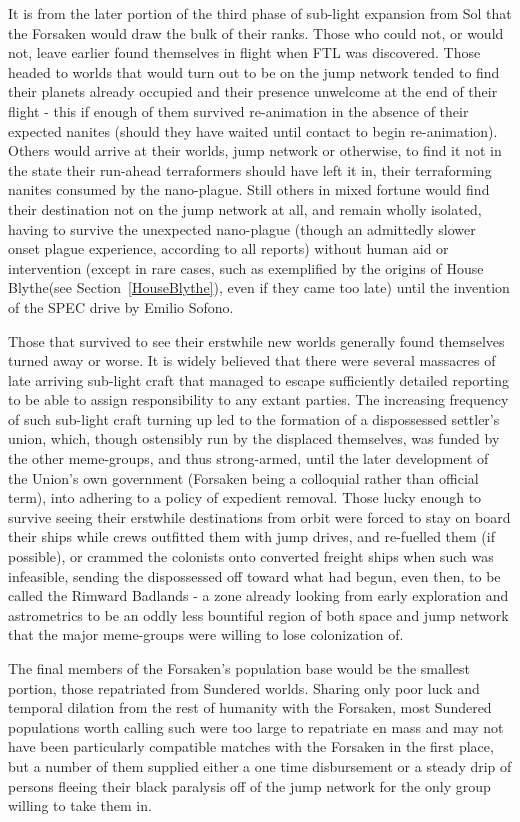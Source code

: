 It is from the later portion of the third phase of sub-light expansion
from Sol that the Forsaken would draw the bulk of their ranks. Those
who could not, or would not, leave earlier found themselves in flight
when FTL was discovered. Those headed to worlds that would turn out to
be on the jump network tended to find their planets already occupied
and their presence unwelcome at the end of their flight - this if
enough of them survived re-animation in the absence of their expected
nanites (should they have waited until contact to begin
re-animation). Others would arrive at their worlds, jump network or
otherwise, to find it not in the state their run-ahead terraformers
should have left it in, their terraforming nanites consumed by the
nano-plague. Still others in mixed fortune would find their destination
not on the jump network at all, and remain wholly isolated, having to
survive the unexpected nano-plague (though an admittedly slower onset
plague experience, according to all reports) without human aid or
intervention (except in rare cases, such as exemplified by the origins
of House Blythe(see Section~\ref{HouseBlythe}), even if they came too late) until the invention of
the SPEC drive by Emilio Sofono.

Those that survived to see their erstwhile new worlds generally found
themselves turned away or worse. It is widely believed that there were
several massacres of late arriving sub-light craft that managed to
escape sufficiently detailed reporting to be able to assign
responsibility to any extant parties. The increasing frequency of such
sub-light craft turning up led to the formation of a dispossessed
settler's union, which, though ostensibly run by the displaced
themselves, was funded by the other meme-groups, and thus
strong-armed, until the later development of the Union's own
government (Forsaken being a colloquial rather than official term),
into adhering to a policy of expedient removal. Those lucky enough to
survive seeing their erstwhile destinations from orbit were forced to
stay on board their ships while crews outfitted them with jump drives,
and re-fuelled them (if possible), or crammed the colonists onto
converted freight ships when such was infeasible, sending the
dispossessed off toward what had begun, even then, to be called the
Rimward Badlands - a zone already looking from early exploration and
astrometrics to be an oddly less bountiful region of both space and
jump network that the major meme-groups were willing to lose
colonization of.

The final members of the Forsaken's population base would be the
smallest portion, those repatriated from Sundered worlds. Sharing only
poor luck and temporal dilation from the rest of humanity with the
Forsaken, most Sundered populations worth calling such were too large
to repatriate en mass and may not have been particularly compatible
matches with the Forsaken in the first place, but a number of them
supplied either a one time disbursement or a steady drip of persons
fleeing their black paralysis off of the jump network for the only
group willing to take them in.
 
